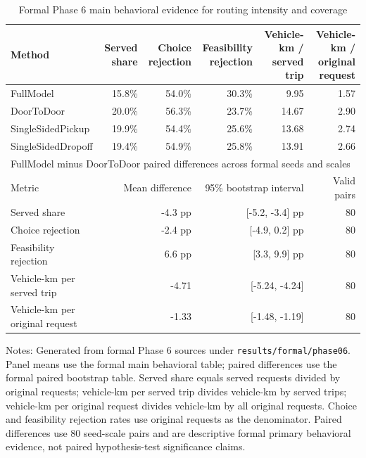 \begin{table}[width=\textwidth,pos=t]
\centering
\caption{Formal Phase 6 main behavioral evidence for routing intensity and coverage}
\label{tab:phase06-main-behavioral}
\scriptsize
\begin{tabular*}{\tblwidth}{@{\extracolsep{\fill}}lrrrrr@{}}
\toprule
Method & Served share & Choice rejection & Feasibility rejection & Vehicle-km / served trip & Vehicle-km / original request \\
\midrule
FullModel & 15.8\% & 54.0\% & 30.3\% & 9.95 & 1.57 \\
DoorToDoor & 20.0\% & 56.3\% & 23.7\% & 14.67 & 2.90 \\
SingleSidedPickup & 19.9\% & 54.4\% & 25.6\% & 13.68 & 2.74 \\
SingleSidedDropoff & 19.4\% & 54.9\% & 25.8\% & 13.91 & 2.66 \\
\midrule
\multicolumn{6}{p{0.94\textwidth}}{FullModel minus DoorToDoor paired differences across formal seeds and scales} \\
Metric & \multicolumn{2}{r}{Mean difference} & \multicolumn{2}{r}{95\% bootstrap interval} & Valid pairs \\
\midrule
Served share & \multicolumn{2}{r}{-4.3 pp} & \multicolumn{2}{r}{[-5.2, -3.4] pp} & 80 \\
Choice rejection & \multicolumn{2}{r}{-2.4 pp} & \multicolumn{2}{r}{[-4.9, 0.2] pp} & 80 \\
Feasibility rejection & \multicolumn{2}{r}{6.6 pp} & \multicolumn{2}{r}{[3.3, 9.9] pp} & 80 \\
Vehicle-km per served trip & \multicolumn{2}{r}{-4.71} & \multicolumn{2}{r}{[-5.24, -4.24]} & 80 \\
Vehicle-km per original request & \multicolumn{2}{r}{-1.33} & \multicolumn{2}{r}{[-1.48, -1.19]} & 80 \\
\bottomrule
\end{tabular*}
\begin{minipage}{0.94\linewidth}
\footnotesize Notes: Generated from formal Phase 6 sources under \texttt{results/formal/phase06}. Panel means use the formal main behavioral table; paired differences use the formal paired bootstrap table. Served share equals served requests divided by original requests; vehicle-km per served trip divides vehicle-km by served trips; vehicle-km per original request divides vehicle-km by all original requests. Choice and feasibility rejection rates use original requests as the denominator. Paired differences use 80 seed-scale pairs and are descriptive formal primary behavioral evidence, not paired hypothesis-test significance claims.
\end{minipage}
\end{table}
